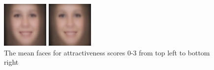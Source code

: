 \documentclass[10pt,twocolumn,letterpaper]{article}
\begin{document}
\begin {figure} [h]
\begin {minipage}{0.22\textwidth}
    \end{minipage}
    \begin {minipage}{0.22\textwidth}
        \includegraphics[width = \linewidth]{mean_2.png}
    \end {minipage}
    \begin {minipage}{0.22\textwidth}
        \includegraphics[width = \linewidth]{mean_3.png}
    \end{minipage}
    \label{fig:mean_faces}
    \caption{The mean faces for attractiveness scores 0-3 from top left to bottom right}
\end {figure}
\end{document}
